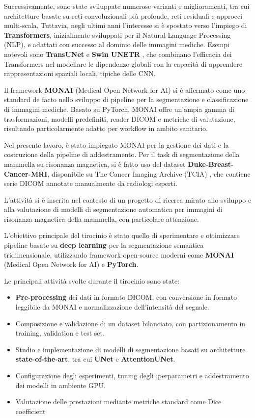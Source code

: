 \documentclass[minted, draw]{../tex/hebdomon}
\begin{document}
Successivamente, sono state sviluppate numerose varianti e miglioramenti, tra cui architetture basate su reti convoluzionali più profonde, reti residuali e approcci multi-scala. Tuttavia, negli ultimi anni l’interesse si è spostato verso l’impiego di \textbf{Transformers}, inizialmente sviluppati per il Natural Language Processing (NLP), e adattati con successo al dominio delle immagini mediche. Esempi notevoli sono \textbf{TransUNet} \cite{chen2021transunet} e \textbf{Swin UNETR} \cite{hatamizadeh2022swin}, che combinano l’efficacia dei Transformers nel modellare le dipendenze globali con la capacità di apprendere rappresentazioni spaziali locali, tipiche delle CNN.

Il framework \textbf{MONAI} (Medical Open Network for AI) \cite{cardoso2022monai} si è affermato come uno standard de facto nello sviluppo di pipeline per la segmentazione e classificazione di immagini mediche. Basato su PyTorch, MONAI offre un’ampia gamma di trasformazioni, modelli predefiniti, reader DICOM e metriche di valutazione, risultando particolarmente adatto per workflow in ambito sanitario.

Nel presente lavoro, è stato impiegato MONAI per la gestione dei dati e la costruzione della pipeline di addestramento. Per il task di segmentazione della mammella su risonanza magnetica, si è fatto uso del dataset \textbf{Duke-Breast-Cancer-MRI}, disponibile su The Cancer Imaging Archive (TCIA) \cite{duke_breast_mri}, che contiene serie DICOM annotate manualmente da radiologi esperti.


L’attività si è inserita nel contesto di un progetto di ricerca mirato allo sviluppo e alla valutazione di modelli di segmentazione automatica per immagini di risonanza magnetica della mammella, con particolare attenzione.

L’obiettivo principale del tirocinio è stato quello di sperimentare e ottimizzare pipeline basate su \textbf{deep learning} per la segmentazione semantica tridimensionale, utilizzando framework open-source moderni come \textbf{MONAI} (Medical Open Network for AI) e \textbf{PyTorch}.

Le principali attività svolte durante il tirocinio sono state:
\begin{itemize}
    \item \textbf{Pre-processing} dei dati in formato DICOM, con conversione in formato leggibile da MONAI e normalizzazione dell’intensità del segnale.
    \item Composizione e validazione di un dataset bilanciato, con partizionamento in training, validation e test set.
    \item Studio e implementazione di modelli di segmentazione basati su architetture \textbf{state-of-the-art}, tra cui \textbf{UNet} e \textbf{AttentionUNet}.
    \item Configurazione degli esperimenti, tuning degli iperparametri e addestramento dei modelli in ambiente GPU.
    \item Valutazione delle prestazioni mediante metriche standard come Dice coefficient
\end{itemize}
\end{document}
